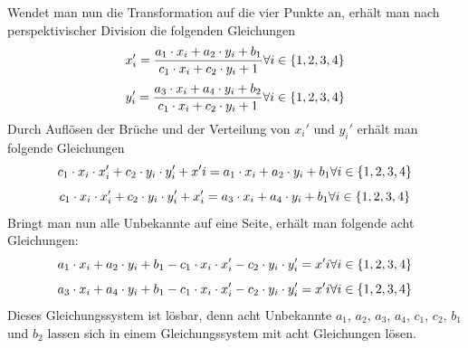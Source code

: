 \documentclass[
  ngerman,
  a4paper,  %
  twoside,  %
  bibliography=totoc,
  headsepline,
  cleardoublepage=empty,
  parskip=half,
  draft=false
]{scrbook}
\begin{document}
Wendet man nun die Transformation auf die vier Punkte an, erhält man nach perspektivischer Division die folgenden Gleichungen
\begin{equation}
  x_i'=\frac{a_1\cdot x_i+a_2\cdot y_i+b_1}{c_1\cdot x_i+c_2\cdot y_i +1}\\\forall i\in\{1,2,3,4\}
\end{equation}
\begin{equation}
  y_i'=\frac{a_3\cdot x_i+a_4\cdot y_i+b_2}{c_1\cdot x_i+c_2\cdot y_i +1}\\\forall i\in\{1,2,3,4\}
\end{equation}
Durch Auflösen der Brüche und der Verteilung von $x_i'$ und $y_i'$ erhält man folgende Gleichungen
\begin{equation}
  c_1\cdot x_i\cdot x_i'+c_2\cdot y_i\cdot y_i'+x'i=a_1\cdot x_i+a_2\cdot y_i+b_1\\\forall i\in\{1,2,3,4\}
\end{equation}
\begin{equation}
  c_1\cdot x_i\cdot x_i'+c_2\cdot y_i\cdot y_i'+x_i'=a_3\cdot x_i+a_4\cdot y_i+b_1\\\forall i\in\{1,2,3,4\}
\end{equation}
Bringt man nun alle Unbekannte auf eine Seite, erhält man folgende acht Gleichungen:
\begin{equation}
  a_1\cdot x_i+a_2\cdot y_i+b_1-c_1\cdot x_i\cdot x_i'-c_2\cdot y_i\cdot y_i'=x'i\\\forall i\in\{1,2,3,4\}
\end{equation}
\begin{equation}
  a_3\cdot x_i+a_4\cdot y_i+b_1-c_1\cdot x_i\cdot x_i'-c_2\cdot y_i\cdot y_i'=x'i\\\forall i\in\{1,2,3,4\}
\end{equation}
Dieses Gleichungssystem ist lösbar, denn acht Unbekannte $a_1$, $a_2$, $a_3$, $a_4$, $c_1$, $c_2$, $b_1$ und $b_2$ lassen sich in einem Gleichungssystem mit acht Gleichungen lösen.




\end{document}
